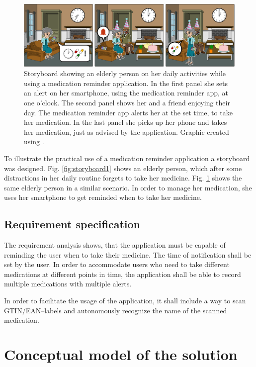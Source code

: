 \documentclass[conference]{IEEEtran}
\begin{document}
\begin{figure}
	\includegraphics[width=\textwidth]{images/storyboard02.png}
	\caption
	{Storyboard showing an elderly person on her daily activities while using a medication reminder application.
		In the first panel she sets an alert on her smartphone, using the medication reminder app, at one o'clock.
		The second panel shows her and a friend enjoying their day. The medication reminder app alerts her at the set time, to take her medication.
		In the last panel she picks up her phone and takes her medication, just as advised by the application.
		Graphic created using \cite{storyboard}.}
	\label{fig:storyboard2}
\end{figure}

To illustrate the practical use of a medication reminder application a storyboard was designed.
Fig. \ref{fig:storyboard1} shows an elderly person, which after some distractions in her daily
routine forgets to take her medicine.
Fig. \ref{fig:storyboard2} shows the same elderly person in a similar scenario. In order to manage
her medication, she uses her smartphone to get reminded when to take her medicine.

\subsection{Requirement specification}
The requirement analysis shows, that the application must be capable of reminding the user when to take
their medicine. The time of notification shall be set by the user. In order to accommodate users who need
to take different medications at different points in time, the application shall be able to record multiple
medications with multiple alerts.

In order to facilitate the usage of the application, it shall include a way to scan GTIN/EAN--labels and
autonomously recognize the name of the scanned medication.

\section{Conceptual model of the solution}
\end{document}
